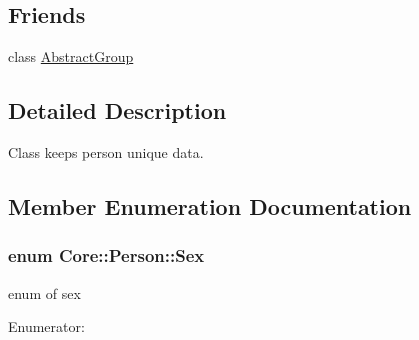 \subsection*{Friends}
\begin{DoxyCompactItemize}
\item 
class \hyperlink{classCore_1_1Person_a8be971ab18693e55f617c7dc8abc3e26}{AbstractGroup}
\end{DoxyCompactItemize}


\subsection{Detailed Description}
Class keeps person unique data. 

\subsection{Member Enumeration Documentation}
\hypertarget{classCore_1_1Person_a01e6eee93727f9ce06525eca689b4764}{
\subsubsection[{Sex}]{\setlength{\rightskip}{0pt plus 5cm}enum {\bf Core::Person::Sex}}}
\label{d9/d71/classCore_1_1Person_a01e6eee93727f9ce06525eca689b4764}
enum of sex \begin{Desc}
\item[Enumerator: ]\par
\begin{description}
\item[{\em 
\hypertarget{classCore_1_1Person_a01e6eee93727f9ce06525eca689b4764aeb7355bb082d0aa0d2b315e5dfaa2de9}{
MALE}
\label{d9/d71/classCore_1_1Person_a01e6eee93727f9ce06525eca689b4764aeb7355bb082d0aa0d2b315e5dfaa2de9}
}]\item[{\em 
\hypertarget{classCore_1_1Person_a01e6eee93727f9ce06525eca689b4764a0c4f3aef529b75d197d411a6336ec3a1}{
FEMALE}
\label{d9/d71/classCore_1_1Person_a01e6eee93727f9ce06525eca689b4764a0c4f3aef529b75d197d411a6336ec3a1}
}]\end{description}
\end{Desc}



